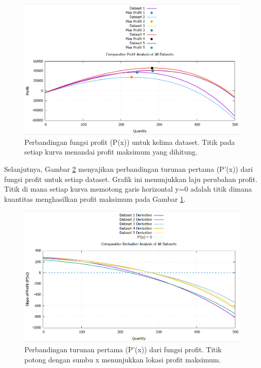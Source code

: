 \documentclass[conference]{IEEEtran}
\begin{document}
\vspace{1cm}
\begin{figure}[htbp]
\centering
\includegraphics[width=\columnwidth]{plot_all_profits.png}
\caption{Perbandingan fungsi profit (P(x)) untuk kelima dataset. Titik pada setiap kurva menandai profit maksimum yang dihitung.}
\label{fig:profits}
\end{figure}
\vspace{1cm}

Selanjutnya, Gambar \ref{fig:derivatives} menyajikan perbandingan turunan pertama (P'(x)) dari fungsi profit untuk setiap dataset. Grafik ini menunjukkan laju perubahan profit. Titik di mana setiap kurva memotong garis horizontal y=0 adalah titik dimana kuantitas menghasilkan profit maksimum pada Gambar \ref{fig:profits}.

\begin{figure}[htbp]
\centering
\includegraphics[width=\columnwidth]{plot_all_derivatives.png}
\caption{Perbandingan turunan pertama (P'(x)) dari fungsi profit. Titik potong dengan sumbu x menunjukkan lokasi profit maksimum.}
\label{fig:derivatives}
\end{figure}
\end{document}
